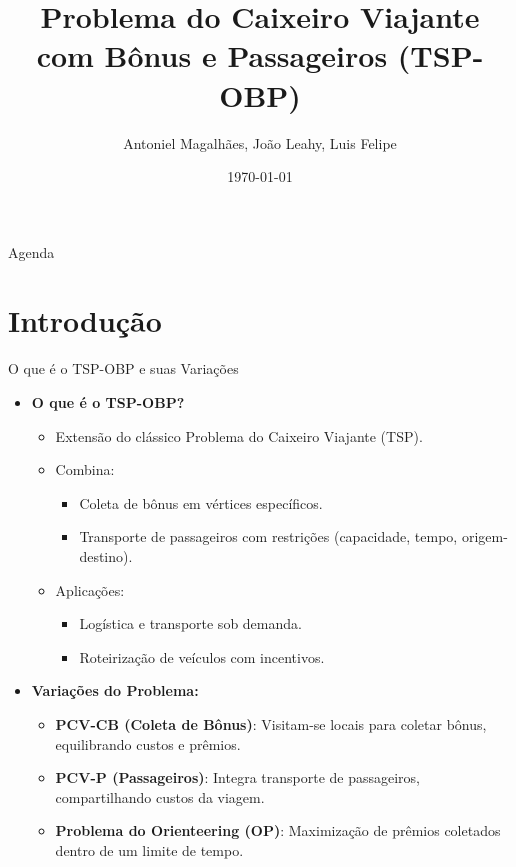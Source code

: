 \documentclass[aspectratio=169,xcolor=table]{beamer}
\author{Antoniel Magalhães, João Leahy, Luis Felipe}
\title{Problema do Caixeiro Viajante com Bônus e Passageiros (TSP-OBP)}
\institute{Universidade Federal da Bahia}
\date{\today}
\begin{document}
\begin{frame}
    \titlepage
\end{frame}

\begin{frame}{Agenda}
    \tableofcontents
\end{frame}

\section{Introdução}

\begin{frame}{O que é o TSP-OBP e suas Variações}
    \begin{itemize}
        \item \textbf{O que é o TSP-OBP?}
        \begin{itemize}
            \item Extensão do clássico Problema do Caixeiro Viajante (TSP).
            \item Combina:
            \begin{itemize}
                \item Coleta de bônus em vértices específicos.
                \item Transporte de passageiros com restrições (capacidade, tempo, origem-destino).
            \end{itemize}
            \item Aplicações: 
            \begin{itemize}
                \item Logística e transporte sob demanda.
                \item Roteirização de veículos com incentivos.
            \end{itemize}
        \end{itemize}
        \item \textbf{Variações do Problema:}
        \begin{itemize}
            \item \textbf{PCV-CB (Coleta de Bônus)}:  
            Visitam-se locais para coletar bônus, equilibrando custos e prêmios.
            \item \textbf{PCV-P (Passageiros)}:  
            Integra transporte de passageiros, compartilhando custos da viagem.
            \item \textbf{Problema do Orienteering (OP)}:  
            Maximização de prêmios coletados dentro de um limite de tempo.
        \end{itemize}
    \end{itemize}
\end{frame}
\end{document}
